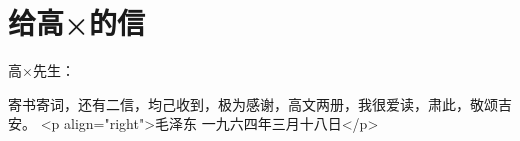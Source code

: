 \section[给高×的信（一九六四年三月十八日）]{给高×的信}


高×先生：

寄书寄词，还有二信，均己收到，极为感谢，高文两册，我很爱读，肃此，敬颂吉安。
<p align="right">毛泽东
一九六四年三月十八日</p>


